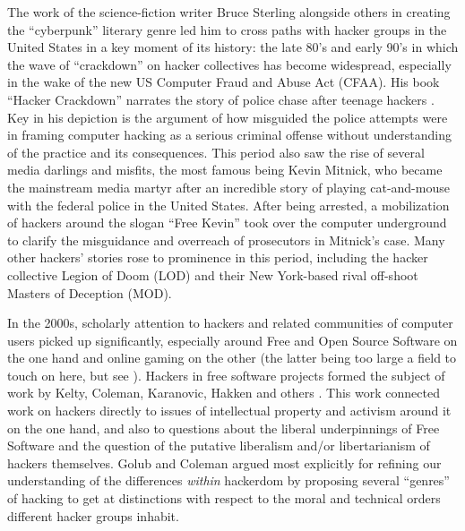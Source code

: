 \documentclass[10pt,letter,oneside]{scrartcl}
\begin{document}
The work of the science-fiction writer Bruce Sterling alongside others in
creating the ``cyberpunk'' literary genre led him to cross paths with hacker
groups in the United States in a key moment of its history: the late 80's and
early 90's in which the wave of ``crackdown'' on hacker collectives has become
widespread, especially in the wake of the new US Computer Fraud and Abuse Act
(CFAA). His book ``Hacker Crackdown'' narrates the story of police chase after
teenage hackers \parencite{sterling_crackdown_1993}.  Key in his depiction is
the argument of how misguided the police attempts were in framing computer
hacking as a serious criminal offense without understanding of the practice and
its consequences.  This period also saw the rise of several media darlings and
misfits, the most famous being Kevin Mitnick, who became the mainstream media
martyr after an incredible story of playing cat-and-mouse with the federal
police in the United States.  After being arrested, a mobilization of hackers
around the slogan ``Free Kevin'' took over the computer underground to clarify
the misguidance and overreach of prosecutors in Mitnick's case.  Many other
hackers' stories rose to prominence in this period, including the hacker
collective Legion of Doom (LOD) and their New York-based rival off-shoot Masters
of Deception (MOD).

In the 2000s, scholarly attention to hackers and related communities of computer
users picked up significantly, especially around Free and Open Source Software
on the one hand and online gaming on the other (the latter being too large a
field to touch on here, but see \textcite{coleman_review_2010a}).  Hackers in
free software projects formed the subject of work by Kelty, Coleman, Karanovic,
Hakken and
others \parencite{kelty_two_2008,coleman_coding_2012,auray_debian_2003,broca_utopie_2013}.
This work connected work on hackers directly to issues of intellectual property
and activism around it on the one hand, and also to questions about the liberal
underpinnings of Free Software and the question of the putative liberalism
and/or libertarianism of hackers themselves.  Golub and Coleman
\cite*{coleman_hacker_2008} argued most explicitly for refining our
understanding of the differences \emph{within} hackerdom by proposing several
``genres'' of hacking to get at distinctions with respect to the moral and
technical orders different hacker groups inhabit.
\end{document}
